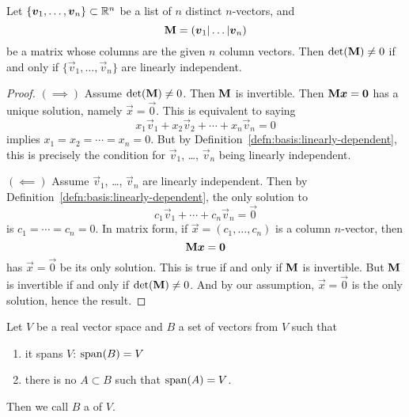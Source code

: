 \begin{theorem}
Let $\{\boldsymbol{v}_{1},\dots,\boldsymbol{v}_{n}\}\subset\mathbb{R}^{n}$ be a list of $n$
distinct $n$-vectors, and
\begin{equation}
\mathbf{M} = (\boldsymbol{v}_{1}|\dots|\boldsymbol{v}_{n})
\end{equation}
be a matrix whose columns are the given $n$ column vectors.
Then $\det(\mathbf{M})\neq0$ if and only if $\{\vec{v}_{1},\dots,\vec{v}_{n}\}$
are linearly independent.
\end{theorem}

\begin{proof}
$(\implies)$ Assume $\det(\mathbf{M})\neq0$. Then $\mathbf{M}$ is invertible.
Then $\mathbf{M}\boldsymbol{x}=\boldsymbol{0}$ has a unique solution, namely $\vec{x}=\vec{0}$.
This is equivalent to saying
\begin{equation}
x_{1}\vec{v}_{1} + x_{2}\vec{v}_{2} + \cdots + x_{n}\vec{v}_{n} = 0
\end{equation}
implies $x_{1}=x_{2}=\cdots=x_{n}=0$. But by Definition~\ref{defn:basis:linearly-dependent},
this is precisely the condition for $\vec{v}_{1}$, \dots, $\vec{v}_{n}$
being linearly independent.

$(\impliedby)$ Assume $\vec{v}_{1}$, \dots, $\vec{v}_{n}$ are linearly
independent. Then by Definition~\ref{defn:basis:linearly-dependent}, the
only solution to
\begin{equation}
c_{1}\vec{v}_{1} + \cdots + c_{n}\vec{v}_{n} = \vec{0}
\end{equation}
is $c_{1}=\cdots=c_{n}=0$. In matrix form, if $\vec{x}=(c_{1},\dots,c_{n})$
is a column $n$-vector, then
\begin{equation}
\mathbf{M}\boldsymbol{x} = \boldsymbol{0}
\end{equation}
has $\vec{x}=\vec{0}$ be its only solution. This is true if and only if
$\mathbf{M}$ is invertible. But $\mathbf{M}$ is invertible if and only if
$\det(\mathbf{M})\neq0$. And by our assumption, $\vec{x}=\vec{0}$ is the
only solution, hence the result.
\end{proof}

\begin{definition}
Let $V$ be a real vector space and $B$ a set of vectors from $V$ such
that
\begin{enumerate}
\item it spans $V$: $\operatorname{span}(B)=V$
\item there is no $A\subset B$ such that $\operatorname{span}(A)=V$.
\end{enumerate}
Then we call $B$ a  of $V$.
\end{definition}

